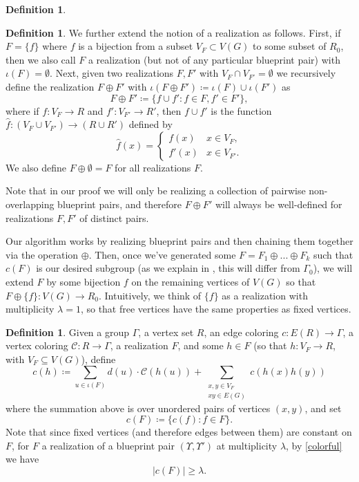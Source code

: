 \documentclass{article}
\newcommand{\cC}{\mathcal{C} }
\theoremstyle{definition}
\newtheorem{defn}[theorem]{Definition}
\begin{document}
\begin{defn}
     \begin{defn}
         We further extend the notion of a realization as follows. First, if $F=\{f\}$ where $f$ is a bijection from a subset $V_F\subset V(G)$ to some subset of $R_0$, then we also call $F$ a realization (but not of any particular blueprint pair) with $\iota(F)=\emptyset$. Next, given two realizations $F,F'$ with $V_F\cap V_{F'}=\emptyset$ we recursively define the realization $F\oplus F'$ with $\iota(F\oplus F')\coloneqq \iota(F)\cup \iota(F')$ as
    $$F \oplus F' \coloneqq  \{f\cup f' : f\in F, f'\in F'\}, $$
where if $f:V_F\to R$ and $f':V_{F'}\to R'$, then $f\cup f'$ is the function $\hat{f}:(V_F\cup V_{F'}) \to (R\cup R')$ defined by $$\hat{f}(x) = \begin{cases}
        f(x) & x \in V_F ,\\
        f'(x) & x \in V_{F'}.
    \end{cases}$$
    We also define $F\oplus \emptyset=F$ for all realizations $F$.
    
    Note that in our proof we will only be realizing a collection of pairwise non-overlapping blueprint pairs, and therefore $F\oplus F'$ will always be well-defined for realizations $F,F'$ of distinct pairs.
     \end{defn}

    Our algorithm works by realizing blueprint pairs and then chaining them together via the operation $\oplus$. Then, once we've generated some $F=F_1\oplus...\oplus F_k$ such that $c(F)$ is our desired subgroup (as we explain in , this will differ from $\Gamma_0$), we will extend $F$ by some bijection $f$ on the remaining vertices of $V(G)$ so that $F\oplus \{f\}:V(G)\to R_0$. Intuitively, we think of $\{f\}$ as a realization with multiplicity $\lambda=1$, so that free vertices have the same properties as fixed vertices.


   
    
\end{defn}


\begin{defn}\label{def.func_col}
    Given a group $\Gamma$, a vertex set $R$, an edge coloring $c : E(R) \to \Gamma$, a vertex coloring $\cC : R \to \Gamma$, a realization $F$, and some $h\in F$ (so that $h:V_F\to R$, with $V_F\subseteq V(G)$), define
    $$
   c(h)\coloneqq \sum_{u\in \iota(F)}d(u)\cdot \cC(h(u))+\sum_{\substack{x,y\in V_F \\ xy\in E(G)}}c(h(x)h(y))$$
   where the summation above is over unordered pairs of vertices $(x, y)$, and set
   \[c(F) \coloneqq \{c(f):f\in F\}.\]
Note that since fixed vertices (and therefore edges between them) are constant on $F$, for $F$ a realization of a blueprint pair $(\Upsilon,\Upsilon')$ at multiplicity $\lambda$, by \cref{colorful} we have
\[|c(F)|\geq \lambda.\]
\end{defn}
\end{document}
